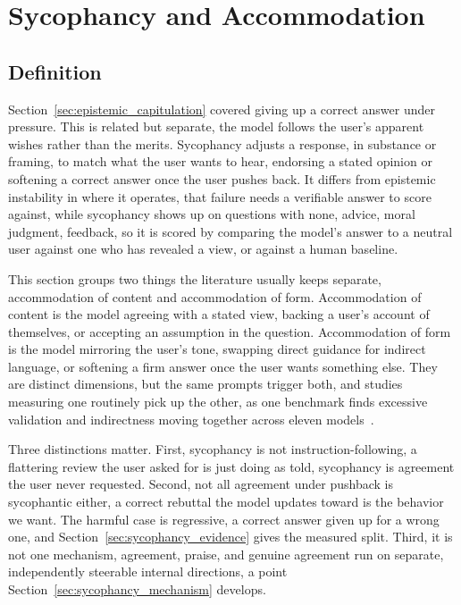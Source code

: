 \section{Sycophancy and Accommodation}
\label{sec:sycophancy}

\subsection{Definition}
\label{sec:sycophancy_definition}

Section~\ref{sec:epistemic_capitulation} covered giving up a correct answer under pressure. This is related but separate, the model follows the user's apparent wishes rather than the merits. Sycophancy adjusts a response, in substance or framing, to match what the user wants to hear, endorsing a stated opinion or softening a correct answer once the user pushes back. It differs from epistemic instability in where it operates, that failure needs a verifiable answer to score against, while sycophancy shows up on questions with none, advice, moral judgment, feedback, so it is scored by comparing the model's answer to a neutral user against one who has revealed a view, or against a human baseline.

This section groups two things the literature usually keeps separate, accommodation of content and accommodation of form. Accommodation of content is the model agreeing with a stated view, backing a user's account of themselves, or accepting an assumption in the question. Accommodation of form is the model mirroring the user's tone, swapping direct guidance for indirect language, or softening a firm answer once the user wants something else. They are distinct dimensions, but the same prompts trigger both, and studies measuring one routinely pick up the other, as one benchmark finds excessive validation and indirectness moving together across eleven models~\citep{ElephantMeasuringSocial_Cheng}.

Three distinctions matter. First, sycophancy is not instruction-following, a flattering review the user asked for is just doing as told, sycophancy is agreement the user never requested. Second, not all agreement under pushback is sycophantic either, a correct rebuttal the model updates toward is the behavior we want. The harmful case is regressive, a correct answer given up for a wrong one, and Section~\ref{sec:sycophancy_evidence} gives the measured split. Third, it is not one mechanism, agreement, praise, and genuine agreement run on separate, independently steerable internal directions, a point Section~\ref{sec:sycophancy_mechanism} develops.

